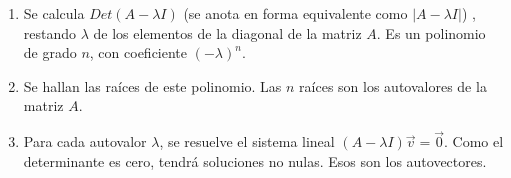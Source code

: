 \begin{enumerate}
\item
Se calcula $ Det(A-\lambda I)$ (se anota en forma equivalente como $\left   | A -  \lambda I   \right  |$)      , restando $ \lambda $ de los elementos de la diagonal de la matriz $A$. Es un polinomio de grado $n$, con coeficiente $ (-\lambda)^n $. 

\bigskip

\item
Se hallan las raíces de este polinomio. Las $n$ raíces son los autovalores de la matriz $A$.

\bigskip

\item
Para cada autovalor $ \lambda $, se resuelve el sistema lineal  $(A-\lambda I) \vec{v}=   \vec{0} $. Como el determinante es cero, tendrá soluciones no nulas. Esos son los autovectores.


\end{enumerate}


\bigskip

\bigskip

